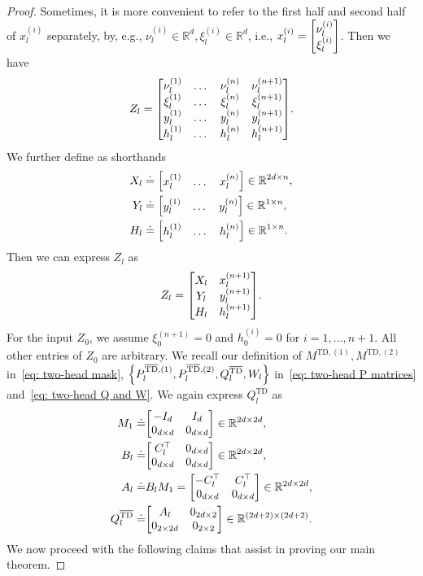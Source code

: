\documentclass{article}
\newcommand{\R}{\mathbb{R}}
\newcommand{\bartd}{\overline{\text{TD}}}
\begin{document}
\begin{proof}
    Sometimes, it is more convenient to refer to the first half and second half of $x_l^{(i)}$ separately, 
    by, e.g., $\nu^{(i)}_l \in \R^d, \xi_l^{(i)} \in \R^d$, i.e., $x_l^{(i)} = \mqty[\nu_l^{(i)} \\ \xi_l^{(i)}]$.
    Then we have
    \begin{align}
        Z_l = \mqty[\nu_l^{(1)} & \dots & \nu_l^{(n)} & \nu_l^{(n+1)} \\
        \xi_l^{(1)} & \dots & \xi_l^{(n)} & \xi_l^{(n+1)} \\
         y_l^{(1)} & \dots & y_l^{(n)} & y_l^{(n+1)} \\
         h_l^{(1)} & \dots & h_l^{(n)} & h_l^{(n+1)}].
    \end{align}
    We further define as shorthands
    \begin{align}
        X_l &\doteq \mqty[x_l^{(1)} & \dots & x_l^{(n)}] \in \R^{2d \times n}, \\
        Y_l &\doteq \mqty[y_l^{(1)} & \dots & y_l^{(n)}] \in \R^{1 \times n}, \\
        H_l &\doteq \mqty[h_l^{(1)} & \dots & h_l^{(n)}] \in \R^{1 \times n}.
    \end{align}
    Then we can express $Z_l$ as 
    \begin{align}
        Z_l = \mqty[X_l & x_l^{(n+1)} \\
                    Y_l & y_l^{(n+1)} \\
                    H_l & h_l^{(n+1)}].
    \end{align}
    For the input $Z_0$, we assume $\xi_0^{(n+1)} = 0$ and $h_0^{(i)} = 0$ for $i = 1, \dots, n+1$.
    All other entries of $Z_0$ are arbitrary.
    We recall our definition of $M^{\bartd, (1)}, M^{\bartd, (2)}$ in~\eqref{eq: two-head mask}, $\qty{P_l^{\bartd, (1)}, P_l^{\bartd, (2)}, Q_l^{\bartd}, W_l}$ in~\eqref{eq: two-head P matrices} and~\eqref{eq: two-head Q and W}. 
    We again express $Q_l^{\bartd}$ as
    \begin{align}
      M_1 \doteq& \mqty[-I_{d} & I_{d} \\
                        0_{d \times d} & 0_{d \times d}] \in \R^{2d \times 2d}, \label{eq: two-head M_1 define}\\
      B_l \doteq& \mqty[C_l^\top & 0_{d\times d} \\ 
                        0_{d \times d} & 0_{d \times d}] \in \R^{2d \times 2d},\\
      A_l \doteq& B_l M_1  = \mqty[-C_l^\top & C_l^\top \\ 
                                   0_{d \times d} & 0_{d \times d}] \in \R^{2d \times 2d},\\
      Q_l^{\bartd} \doteq& \mqty[A_l & 0_{2d \times 2} \\ 
                        0_{2 \times 2d} & 0_{2\times 2}] \in \R^{(2d+2) \times (2d+2)}.
    \end{align}
    We now proceed with the following claims that assist in proving our main theorem.
    

\end{proof}
\end{document}
